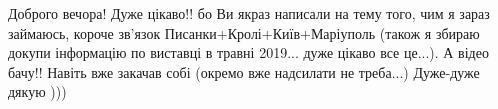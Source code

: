  
 
 
 
 

Доброго вечора! Дуже цікаво!! бо Ви якраз написали на тему того, чим я зараз
займаюсь, короче зв'язок Писанки+Кролі+Київ+Маріуполь (також я збираю докупи інформацію по
виставці в травні 2019... дуже цікаво все це...). А відео бачу!! Навіть вже
закачав собі (окремо вже надсилати не треба...) Дуже-дуже дякую ))) 
